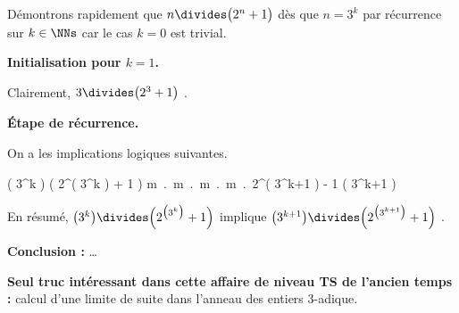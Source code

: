 \documentclass[12pt]{article}
\begin{document}
Démontrons rapidement que $n \divides \big( 2^n + 1 \big)$ dès que $n = 3^k$ par récurrence sur $k \in \NNs$ car le cas $k = 0$ est trivial.

\bigskip

\textbf{Initialisation pour $k = 1$.}

\smallskip

Clairement, $3 \divides \big( 2^3 + 1 \big)$ .

\bigskip

\textbf{Étape de récurrence.}

\smallskip

On a les implications logiques suivantes.

\medskip

\begin{stepcalc}[style=ar*, ope=\implies]
	\big( 3^k \big) \divides \Big( 2^{\big( 3^k \big)} + 1 \Big)
\explnext{}
	\exists m \in \ZZ \,.\, \Big[ 2^{\big( 3^k \big)} + 1 = m \cdot 3^k  \Big]
\explnext{}
	\exists m \in \ZZ \,.\, \Big[ 2^{\big( 3^k \big)} = - 1 + m \cdot 3^k  \Big]
\explnext{}
	\exists m \in \ZZ \,.\, \Big[ \left( 2^{\big( 3^k \big)} \right)^3 = \big( - 1 + m \cdot 3^k \big)^3  \Big]
\explnext{}
	\exists m \in \ZZ \,.\, \Big[ 2^{\big( 3^{k+1} \big)} = - 1 + 3 \cdot m \cdot 3^k - 3 \cdot \big( m \cdot 3^k \big)^2 + \big( m \cdot 3^k \big)^3  \Big]
	2^{\big( 3^{k+1} \big)} \equiv - 1 \mod\!\big( 3^{k+1} \big)
\end{stepcalc}

\smallskip

En résumé, 
$\big( 3^k \big) \divides \Big( 2^{\big( 3^k \big)} + 1 \Big)$ 
implique
$\big( 3^{k+1} \big) \divides \Big( 2^{\big( 3^{k+1} \big)} + 1 \Big)$  .

\bigskip

\textbf{Conclusion :} \dots

\bigskip

\textbf{Seul truc intéressant dans cette affaire de niveau TS de l'ancien temps :} calcul d'une limite de suite dans l'anneau des entiers $3$-adique.
\end{document}
